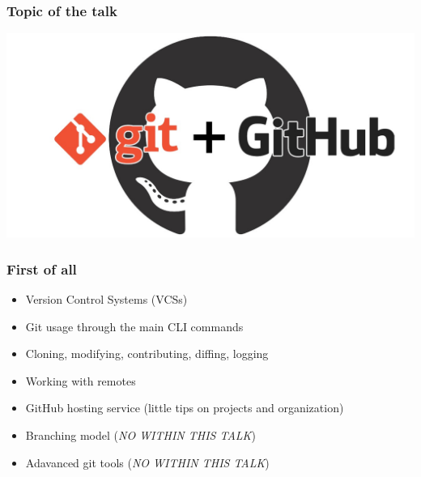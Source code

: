 \documentclass{beamer}
\begin{document}
\begin{frame}
	\frametitle{Topic of the talk}
	\addtocounter{nframe}{1}

	\begin{center}
		\includegraphics[width=.7\textwidth]{./imgs/git-github.jpeg}
	\end{center}


\end{frame}


\begin{frame}
	\frametitle{First of all}
	\addtocounter{nframe}{1}

	\begin{itemize}
		\item<1-> Version Control Systems (VCSs) 
		\item<2-> Git usage through the main CLI commands 
		\item<3-> Cloning, modifying, contributing, diffing, logging
		\item<4-> Working with remotes
		\item<5-> GitHub hosting service (little tips on projects and organization)
		\item<6-> Branching model (\emph{NO WITHIN THIS TALK})
		\item<7-> Adavanced git tools (\emph{NO WITHIN THIS TALK})
	\end{itemize}

\end{frame}
\end{document}
